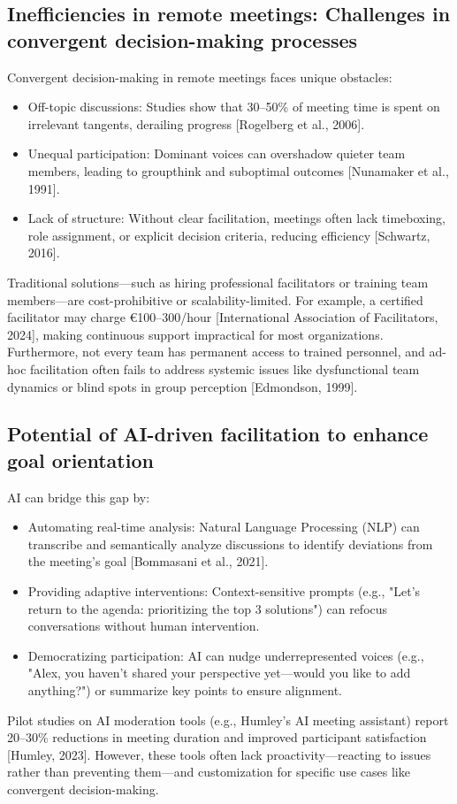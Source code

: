 \subsection{Inefficiencies in remote meetings: Challenges in convergent decision-making processes}
Convergent decision-making in remote meetings faces unique obstacles:
\begin{itemize}
  \item Off-topic discussions: Studies show that 30–50\% of meeting time is spent on irrelevant tangents,
    derailing progress [Rogelberg et al., 2006]. \cite{chenAreWeTrack2025}
  \item Unequal participation: Dominant voices can overshadow quieter team members, leading to groupthink and
    suboptimal outcomes [Nunamaker et al., 1991].
  \item Lack of structure: Without clear facilitation, meetings often lack timeboxing, role assignment, or
    explicit decision criteria, reducing efficiency [Schwartz, 2016].
\end{itemize}
Traditional solutions—such as hiring professional facilitators or training team members—are cost-prohibitive
or scalability-limited. For example, a certified facilitator may charge €100–300/hour [International
Association of Facilitators, 2024], making continuous support impractical for most organizations.
Furthermore, not every team has permanent access to trained personnel, and ad-hoc facilitation often fails to
address systemic issues like dysfunctional team dynamics or blind spots in group perception [Edmondson, 1999].

\subsection{Potential of AI-driven facilitation to enhance goal orientation }

AI can bridge this gap by:
\begin{itemize}
  \item Automating real-time analysis: Natural Language Processing (NLP) can transcribe and semantically
    analyze discussions to identify deviations from the meeting’s goal [Bommasani et al., 2021].
  \item Providing adaptive interventions: Context-sensitive prompts (e.g., "Let’s return to the agenda:
    prioritizing the top 3 solutions") can refocus conversations without human intervention.
  \item Democratizing participation: AI can nudge underrepresented voices (e.g., "Alex, you haven’t shared
    your perspective yet—would you like to add anything?") or summarize key points to ensure alignment.
\end{itemize}
Pilot studies on AI moderation tools (e.g., Humley’s AI meeting assistant) report 20–30\% reductions in
meeting duration and improved participant satisfaction [Humley, 2023]. However, these tools often lack
proactivity—reacting to issues rather than preventing them—and customization for specific use cases like
convergent decision-making.

